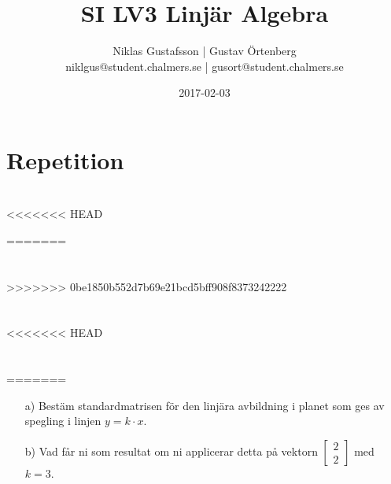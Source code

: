 \documentclass{article}
\title{SI LV3 Linjär Algebra}
\author{Niklas Gustafsson | Gustav Örtenberg  \\ \small{niklgus@student.chalmers.se} | \small{gusort@student.chalmers.se}}
\date{2017-02-03}
\begin{document}
\maketitle
\section*{Repetition}


\section{}


\section{}


\section{}
<<<<<<< HEAD

=======


\section{}


\section{}

>>>>>>> 0be1850b552d7b69e21bcd5bff908f8373242222

\section{}


\section{}
<<<<<<< HEAD


\section{}


=======
\begin{itemize}
	\item[a) ] Bestäm standardmatrisen för den linjära avbildning i planet som ges av spegling i linjen $y=k \cdot x$. 
	\item[b) ] Vad får ni som resultat om ni applicerar detta på vektorn $\begin{bmatrix}2 \\ 2\end{bmatrix}$ med $k=3$.
\end{itemize}
\end{document}
